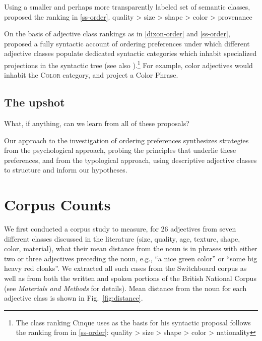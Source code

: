 \documentclass{pnastwo}
\newcommand{\figref}[1]{Fig.~\ref{#1}}
\begin{document}
\begin{article}
Using a smaller and perhaps more transparently labeled set of semantic classes, \cite{sproatshih1991} proposed the ranking in \ref{ss-order}.
\be quality > size > shape > color > provenance\label{ss-order}\ee


On the basis of adjective class rankings as in \ref{dixon-order} and \ref{ss-order}, \cite{cinque1994} proposed a fully syntactic account of ordering preferences under which different adjective classes populate dedicated syntactic categories which inhabit specialized projections in the syntactic tree (see also \cite{scott2002}).\footnote{The class ranking Cinque uses as the basis for his syntactic proposal follows the ranking from \cite{sproatshih1991} in \ref{ss-order}: 
	\be quality > size > shape > color > nationality\label{cinque-order}\ee}
For example, color adjectives would inhabit the \textsc{Color} category, and project a Color Phrase.

\subsection{The upshot}
What, if anything, can we learn from all of these proposals?

Our approach to the investigation of ordering preferences synthesizes strategies from the psychological approach, probing the principles that underlie these preferences, and from the typological approach, using descriptive adjective classes to structure and inform our hypotheses.

\section{Corpus Counts}

We first conducted a corpus study to measure, for 26 adjectives from seven different classes discussed in the literature (size, quality, age, texture, shape, color, material), what their mean distance from the noun is in phrases with either two or three adjectives preceding the noun, e.g., ``a nice green color'' or ``some big heavy red cloaks''. We extracted all such cases from the Switchboard corpus as well as from both the written and spoken portions of the British National Corpus (see \emph{Materials and Methods} for details). Mean distance from the noun for each adjective class is shown in \figref{fig:distance}.


\end{article}
\end{document}
